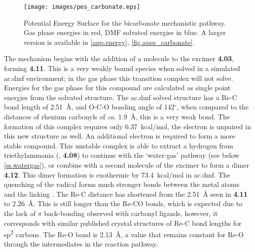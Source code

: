 \begin{figure}[!htb]
 \begin{center}
  \texttt{[image: images/pes\_carbonate.eps]}
 \end{center}
\caption[Potential Energy Surface for the bicarbonate mechanistic pathway.]{Potential Energy Surface for the bicarbonate mechanistic pathway. Gas phase energies in red, DMF solvated energies in blue. A larger version is available in \autoref{app.energy}, \autoref{fig.apes_carbonate}.}
\label{fig.pes_carbonate}
\end{figure}

The mechanism begins with the addition of a  molecule to the excimer \textbf{4.03}, forming \textbf{4.11}. This is a very weakly bound species when solved in a simulated \gls{ac.dmf} environment; in the gas phase this transition complex will not solve. Energies for the gas phase for this compound are calculated as single point energies from the solvated structure. The \gls{ac.dmf} solved structure has a Re-C bond length of 2.51~\r{A}, and O-C-O bonding angle of 142$^\circ$, when compared to the  distances of rhenium carbonyls of \textit{ca.} 1.9~\r{A}, this is a very weak bond. The formation of this complex requires only 6.37~kcal/mol, the electron is unpaired in this new structure as well. An additional electron is required to form a more stable compound. This unstable complex is able to extract a hydrogen from triethylammonia (, \textbf{4.08}) to continue with the `water-gas' pathway (see below \autoref{ss.watergas}), or combine with a second molecule of the excimer to form a dimer \textbf{4.12}. This dimer formation is exothermic by 73.4~kcal/mol in \gls{ac.dmf}. The quenching of the radical forms much stronger bonds between the metal atoms and the linking . The Re-C distance has shortened from the 2.51~\r{A} seen in \textbf{4.11} to 2.26~\r{A}. This is still longer than the Re-CO bonds, which is expected due to the lack of $\pi$ back-bonding observed with carbonyl ligands, however, it corresponds with similar published crystal structures of Re-C bond lengths for sp\textsuperscript{2} carbons\autocite{lukehart1977}. The Re-O bond is 2.13~\r{A}, a value that remains constant for Re-O through the intermediates in the reaction pathway.

